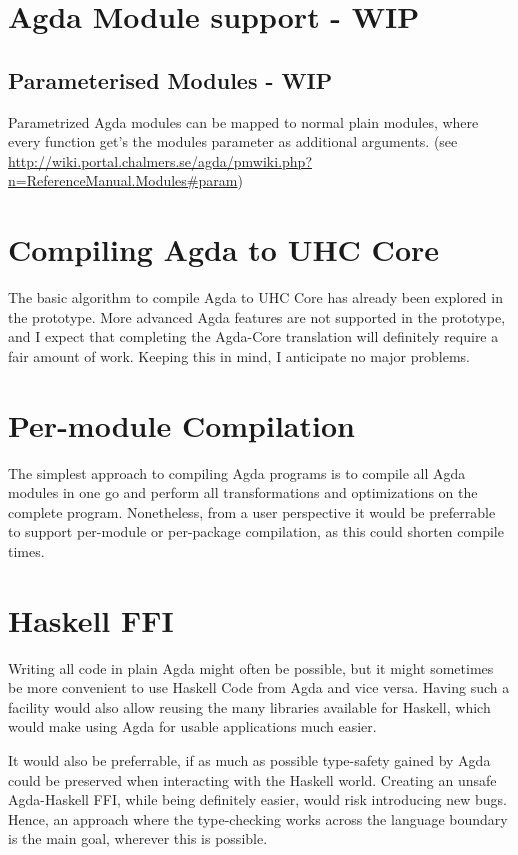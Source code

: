 \documentclass[12pt, a4paper, twoside]{report}
\begin{document}
\section{Agda Module support - WIP}
\subsection{Parameterised Modules - WIP}
Parametrized Agda modules can be mapped to normal plain modules, where every function get's the
modules parameter as additional arguments. (see \url{http://wiki.portal.chalmers.se/agda/pmwiki.php?n=ReferenceManual.Modules#param})

\section{Compiling Agda to UHC Core}
The basic algorithm to compile Agda to UHC Core has already been explored in the prototype. More
advanced Agda features are not supported in the prototype, and I expect that completing the
Agda-Core translation will definitely require a fair amount of work. Keeping this in mind,
I anticipate no major problems.

\section{Per-module Compilation}
The simplest approach to compiling Agda programs is to compile all Agda modules in one go
and perform all transformations and optimizations on the complete program. Nonetheless, from
a user perspective it would be preferrable to support per-module or per-package compilation,
as this could shorten compile times.

\section{Haskell FFI}
\label{sec:prop:hs-ffi}
Writing all code in plain Agda might often be possible, but it might sometimes be more
convenient to use Haskell Code from Agda and vice versa. Having such a facility would
also allow reusing the many libraries available for Haskell, which would make using Agda
for usable applications much easier.

It would also be preferrable, if as much as possible type-safety gained by Agda could be
preserved when interacting with the Haskell world. Creating an unsafe Agda-Haskell
FFI, while being definitely easier, would risk introducing new bugs. Hence, an approach
where the type-checking works across the language boundary is the main goal, wherever
this is possible.
\end{document}
